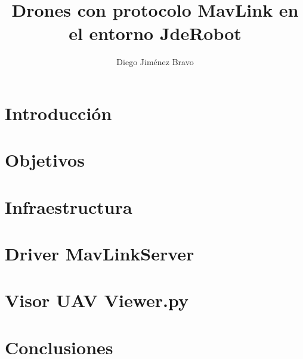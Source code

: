 \documentclass{new_cit_thesis}
\begin{document}
\title{Drones con protocolo MavLink en el entorno JdeRobot}
\author{Diego Jiménez Bravo}
\address{Tutor: Jose Maria Cañas Plaza} 
\copyyear{\the\year}                               
\pubnum{}                                          
\dedication{}  		   


\maketitle
\cleardoublepage



\cleardoublepage


\cleardoublepage


\cleardoublepage
\pagestyle{plain}
\chapter{Introducción}


\cleardoublepage
\chapter{Objetivos}


\cleardoublepage
\chapter{Infraestructura}


\cleardoublepage
\chapter{Driver MavLinkServer}


\cleardoublepage
\chapter{Visor UAV Viewer.py}


\cleardoublepage
\chapter{Conclusiones}


\cleardoublepage

\end{document}
